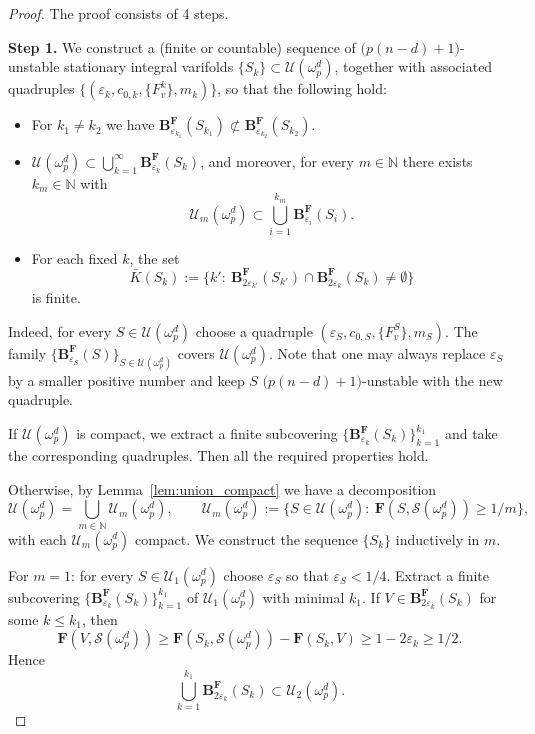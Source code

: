 \documentclass[10pt,a4paper]{amsart}
\begin{document}
\begin{proof}
The proof consists of 4 steps.

\textbf{Step 1.} We construct a (finite or countable) sequence of \(\bigl(p(n-d)+1\bigr)\)-unstable stationary integral varifolds
\(\{S_k\}\subset\mathcal{U}(\omega^d_p)\), together with associated quadruples
\(\{(\varepsilon_k,c_{0,k},\{F^k_v\},m_k)\}\), so that the following hold:

\begin{itemize}
    \item For \(k_1\neq k_2\) we have \(\mathbf B^\mathbf F_{\varepsilon_{k_1}}(S_{k_1})\not\subset \mathbf B^\mathbf F_{\varepsilon_{k_2}}(S_{k_2})\).
    \item \(\mathcal{U}(\omega^d_p)\subset\bigcup_{k=1}^\infty \mathbf B^\mathbf F_{\varepsilon_k}(S_k)\), and moreover, for every \(m\in\mathbb N\) there exists \(k_m\in\mathbb N\) with
    \[
        \mathcal{U}_m(\omega^d_p)\subset\bigcup_{i=1}^{k_m}\mathbf B^\mathbf F_{\varepsilon_i}(S_i).
    \]
    \item For each fixed \(k\), the set
    \[
        \bar K(S_k):=\{k':\ \mathbf B^\mathbf F_{2\varepsilon_{k'}}(S_{k'})\cap\mathbf B^\mathbf F_{2\varepsilon_k}(S_k)\neq\emptyset\}
    \]
    is finite.
\end{itemize}

Indeed, for every \(S\in\mathcal{U}(\omega^d_p)\) choose a quadruple \((\varepsilon_S,c_{0,S},\{F^S_v\},m_S)\). The family \(\{\mathbf B^\mathbf F_{\varepsilon_S}(S)\}_{S\in\mathcal{U}(\omega^d_p)}\) covers \(\mathcal{U}(\omega^d_p)\). Note that one may always replace \(\varepsilon_S\) by a smaller positive number and keep \(S\) \(\bigl(p(n-d)+1\bigr)\)-unstable with the new quadruple.

If \(\mathcal{U}(\omega^d_p)\) is compact, we extract a finite subcovering \(\{\mathbf B^\mathbf F_{\varepsilon_k}(S_k)\}_{k=1}^{k_1}\) and take the corresponding quadruples. Then all the required properties hold.

Otherwise, by Lemma~\ref{lem:union_compact} we have a decomposition
\[
    \mathcal{U}(\omega^d_p)=\bigcup_{m\in\mathbb N}\mathcal{U}_m(\omega^d_p),
\qquad
\mathcal{U}_m(\omega^d_p):=\{S\in\mathcal{U}(\omega^d_p):\ \mathbf F(S,\mathcal{S}(\omega^d_p))\ge 1/m\},
\]
with each \(\mathcal{U}_m(\omega^d_p)\) compact. We construct the sequence \(\{S_k\}\) inductively in \(m\).

For \(m=1\): for every \(S\in\mathcal{U}_1(\omega^d_p)\) choose \(\varepsilon_S\) so that \(\varepsilon_S<1/4\). Extract a finite subcovering \(\{\mathbf B^\mathbf F_{\varepsilon_k}(S_k)\}_{k=1}^{k_1}\) of \(\mathcal{U}_1(\omega^d_p)\) with minimal \(k_1\). If \(V\in\mathbf B^\mathbf F_{2\varepsilon_k}(S_k)\) for some \(k\le k_1\), then
\[
    \mathbf F(V,\mathcal{S}(\omega^d_p)) \ge \mathbf F(S_k,\mathcal{S}(\omega^d_p)) - \mathbf F(S_k,V)
    \ge 1 - 2\varepsilon_k \ge 1/2.
\]
Hence
\[
    \bigcup_{k=1}^{k_1}\mathbf B^\mathbf F_{2\varepsilon_k}(S_k) \subset \mathcal{U}_2(\omega^d_p).
\]


\end{proof}
\end{document}
